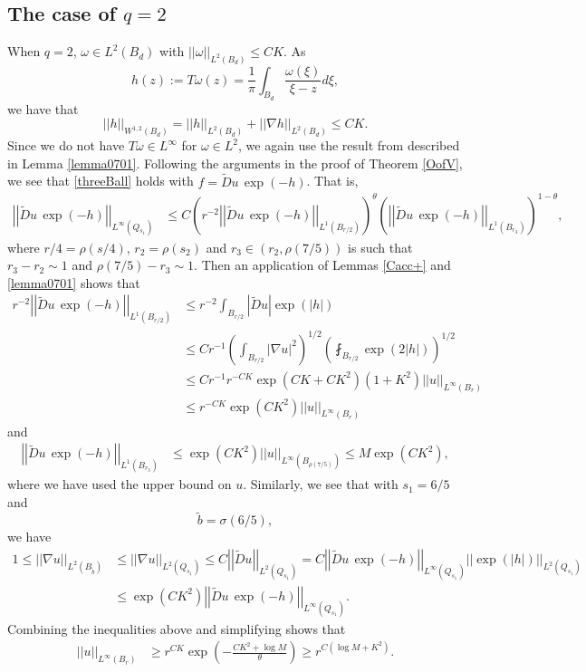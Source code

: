 \documentclass[12pt,reqno]{amsart}
\theoremstyle{plain}
\theoremstyle{definition}
\newcommand{\te}{\theta}
\newcommand{\om}{\omega}
\newcommand{\si}{\sigma}
\newcommand{\iny}{\infty}
\newcommand{\gr}{\nabla}
\newcommand{\norm}[1]{\left\vert \left\vert #1\right\vert\right\vert}
\newcommand{\abs}[1]{\left\vert#1\right\vert}
\newcommand{\pr}[1]{\left( #1 \right) }
\begin{document}
\subsection{The case of $q = 2$}
When $q = 2$, $\om \in L^2\pr{B_d}$ with $\norm{\om}_{L^2\pr{B_d}} \le C K$.
As
\begin{equation*}
h\pr{z} :=T \om (z)=\frac{1}{\pi}\int_{B_d}\frac{\om(\xi)}{\xi-z}d\xi,
\end{equation*}
we have that
$$\norm{h}_{W^{1,2}\pr{B_d}}=\norm{h}_{L^2\pr{B_d}}+ \norm{\gr h}_{L^2\pr{B_d}}\le CK.$$
Since we do not have $T \om \in L^\iny$ for $\om \in L^2$, we again use the result from \cite{KW15} described in Lemma \ref{lemma0701}.
Following the arguments in the proof of Theorem \ref{OofV}, we see that \eqref{threeBall} holds with $f = \widetilde Du \, \exp\pr{-h}$.
That is,
\begin{align*}
\norm{\widetilde Du \, \exp\pr{-h}}_{L^\iny\pr{Q_{s_1}}} 
&\le C \pr{r^{-2} \norm{\widetilde Du \, \exp\pr{-h}}_{L^1\pr{B_{r/2}}}}^\te 
\pr{\norm{\widetilde Du \, \exp\pr{-h}}_{L^1\pr{B_{r_3}}}}^{1 - \te},
\end{align*}
where $r/4 = \rho\pr{s/4}$, $r_2 = \rho\pr{s_2}$ and $r_3 \in \pr{r_2, \rho\pr{7/5}}$ is such that $r_3-r_2 \sim 1$ and $\rho\pr{7/5} - r_3 \sim 1$. 
Then an application of Lemmas \ref{Cacc+} and \ref{lemma0701} shows that
\begin{align*}
r^{-2} \norm{\widetilde Du \, \exp\pr{-h}}_{L^1\pr{B_{r/2}}}
&\le r^{-2} \int_{B_{r/2}} \abs{\widetilde Du} \exp\pr{\abs{h}} \\
&\le C r^{-1} \pr{\int_{B_{r/2}} \abs{\gr u}^2}^{1/2} \pr{\fint_{B_{r/2}}\exp\pr{2\abs{h}}}^{1/2} \\
&\le C r^{-1} r^{-CK}\exp(CK+CK^2) \pr{1 + K^2} \norm{u}_{L^\iny\pr{B_r}} \\
&\le r^{-CK} \exp\pr{C K^2}\norm{u}_{L^\iny\pr{B_r}}
\end{align*}
and
\begin{align*}
\norm{\widetilde Du \, \exp\pr{-h}}_{L^1\pr{B_{r_3}}}
&\le \exp\pr{C K^2}\norm{u}_{L^\iny\pr{B_{\rho\pr{7/5}}}}
\le M \exp\pr{C K^2},
\end{align*}
where we have used the upper bound on $u$.
Similarly, we see that with $s_1=6/5$ and
\begin{equation}
\tilde b = \si\pr{6/5},
\label{btsigma}
\end{equation}
we have
\begin{align*}
1 \le \norm{\gr u}_{L^2\pr{B_{\tilde b}}} 
&\le \norm{\gr u}_{L^2\pr{Q_{s_1}}} 
\le C \norm{\widetilde Du}_{L^2\pr{Q_{s_1}}} 
= C \norm{\widetilde Du \, \exp\pr{-h}}_{L^\iny\pr{Q_{s_1}}} \norm{\exp\pr{\abs{h}}}_{L^2\pr{Q_{s_1}}} \\
&\le \exp(CK^2) \norm{\widetilde Du \, \exp\pr{-h}}_{L^\iny\pr{Q_{s_1}}}.
\end{align*}
Combining the inequalities above and simplifying shows that
\begin{align*}
\norm{u}_{L^\iny\pr{B_r}}
&\ge r^{CK}\exp\pr{- \frac{C K^2 + \log M}{\te}}
\ge r^{C\pr{\log M + K^2}}.
\end{align*}
\end{document}
